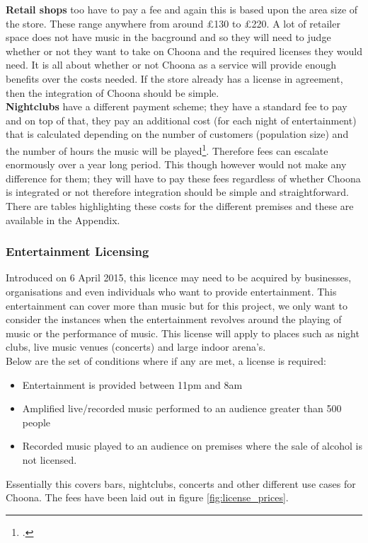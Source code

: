 \textbf{Retail shops} too have to pay a fee and again this is based upon the area size of the store.  These range anywhere from around £130 to £220.  A lot of retailer space does not have music in the bacground and so they will need to judge whether or not they want to take on Choona and the required licenses they would need. It is all about whether or not Choona as a service will provide enough benefits over the costs needed.  If the store already has a license in agreement, then the integration of Choona should be simple.  \\
\textbf{Nightclubs} have a different payment scheme; they have a standard fee to pay and on top of that, they pay an additional cost (for each night of entertainment) that is calculated depending on the number of customers (population size) and the number of hours the music will be played\footcite{ppl}.  Therefore fees can escalate enormously over a year long period.  This though however would not make any difference for them; they will have to pay these fees regardless of whether Choona is integrated or not therefore integration should be simple and straightforward.  
There are tables highlighting these costs for the different premises and these are available in the Appendix.  
      
\subsubsection{Entertainment Licensing}   
Introduced on 6 April 2015, this licence may need to be acquired by businesses, organisations and even individuals who want to provide entertainment.  This entertainment can cover more than music but for this project, we only want to consider the instances when the entertainment revolves around the playing of music or the performance of music.  This license will apply to places such as night clubs, live music venues (concerts) and large indoor arena's.\\
Below are the set of conditions where if any are met, a license is required:
\begin{itemize}
\item Entertainment is provided between 11pm and 8am
\item Amplified live/recorded music performed to an audience greater than 500 people
\item Recorded music played to an audience on premises where the sale of alcohol is not licensed.
\end{itemize}
Essentially this covers bars, nightclubs, concerts and other different use cases for Choona.  The fees have been laid out in figure \ref{fig:license_prices}.\\ 

